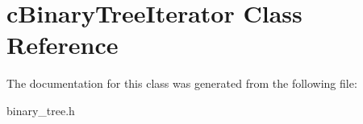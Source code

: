 \hypertarget{classcBinaryTreeIterator}{\section{c\-Binary\-Tree\-Iterator \-Class \-Reference}
\label{classcBinaryTreeIterator}
}


\-The documentation for this class was generated from the following file\-:\begin{DoxyCompactItemize}
\item 
binary\-\_\-tree.\-h\end{DoxyCompactItemize}
